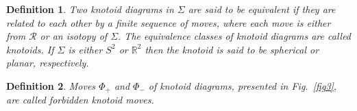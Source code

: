 \documentclass[11pt]{amsart}
\theoremstyle{noparens}
\newtheorem{definition}{Definition}[section]
\numberwithin{equation}{section}
\numberwithin{equation}{section}
\begin{document}
\begin{definition} {\rm 
Two knotoid diagrams in $\Sigma$ are said to be \textit{equivalent} if they are related to each other by a finite sequence of moves, where each move is either from $\mathcal{R}$ or an isotopy of $\Sigma$. The equivalence classes of knotoid diagrams are called \textit{knotoids}. If $\Sigma$ is either $S^2$ or $\mathbb{R}^2$ then the knotoid is said to be \textit{spherical} or \textit{planar}, respectively. 
} 
\end{definition}

\begin{definition} {\rm 
Moves $\Phi_{+}$ and $\Phi_{-}$ of knotoid diagrams, presented in Fig.~\ref{fig3},  are called \textit{forbidden knotoid moves}.
}
\end{definition}
\end{document}

